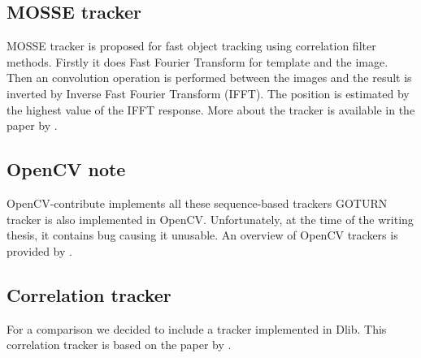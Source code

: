 \subsection*{MOSSE tracker}
MOSSE tracker is proposed for fast object tracking using correlation filter
methods. Firstly it does Fast Fourier Transform for template and the image.
Then an convolution operation is performed between the images and the result is
inverted by Inverse Fast Fourier Transform (IFFT). The position is estimated by
the highest value of the IFFT response. More about the tracker is available in
the paper by \citet*{mosse}.

\subsection*{OpenCV note}
OpenCV-contribute implements all these sequence-based trackers GOTURN tracker
is also implemented in OpenCV. Unfortunately, at the time of the writing
thesis, it contains bug causing it unusable. An overview of OpenCV trackers is
provided by \citet*{opencv-trackers}.

\subsection*{Correlation tracker}
For a comparison we decided to include a tracker implemented in Dlib. This correlation tracker is based on the paper by \citet*{correlation}.


%
%
%
%
%
%

